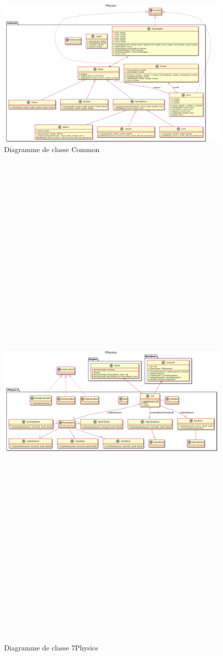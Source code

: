 \documentclass[11pt]{report}
\begin{document}
\begin{figure}[h]
  \centering
  \includegraphics[angle=90, width=15cm]{./Common.png}
  \caption{Diagramme de classe Common}
\end{figure}

\begin{figure}[h]
  \centering
  \includegraphics[angle=90, height=25cm]{./7Physics.png}
  \caption{Diagramme de classe 7Physics}
\end{figure}
\end{document}
